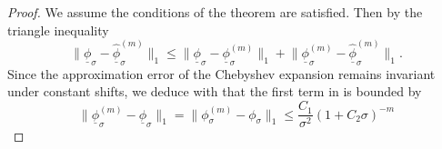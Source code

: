 \begin{proof}
    We assume the conditions of the theorem are satisfied. Then by the triangle inequality
    \begin{equation}
        \lVert \underline{\phi}_{\sigma} - \widehat{\underline{\phi}}_{\sigma}^{(m)}  \rVert _1
        \leq \lVert \underline{\phi}_{\sigma} - \underline{\phi}_{\sigma}^{(m)} \rVert _1
        + \lVert \underline{\phi}_{\sigma}^{(m)} - \widehat{\underline{\phi}}_{\sigma}^{(m)} \rVert _1.
        \label{equ:3-nystrom-nystrom-chebyshev-proof-triangle}
    \end{equation}
    Since the approximation error of the Chebyshev expansion remains invariant
    under constant shifts, we deduce with  that the
    first term in  is bounded by
    \begin{equation}
        \lVert \underline{\phi}_{\sigma}^{(m)} - \underline{\phi}_{\sigma} \rVert _1
        = \lVert \phi_{\sigma}^{(m)} - \phi_{\sigma} \rVert _1
        \leq \frac{C_1}{\sigma^2} (1 + C_2 \sigma)^{-m}
    \end{equation}

\end{proof}
